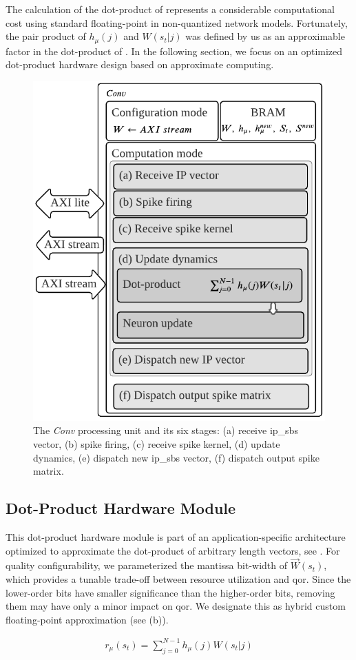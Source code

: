 The calculation of the dot-product of  represents a considerable computational cost using standard floating-point in non-quantized network models. Fortunately, the pair product of $h_{\mu}(j)$ and $W(s_t|j)$ was defined by us as an approximable factor in the dot-product of . In the following section, we focus on an optimized dot-product hardware design based on approximate computing.


\begin{figure}[b!]
	\centering
	\includegraphics[width=0.5\columnwidth]{./chapters/sbs_accelerator/figures/sbs_conv.pdf}
	\caption{The \emph{Conv} processing unit and its six stages: (a) receive \gls{ip_sbs} vector, (b) spike firing, (c) receive spike kernel, (d) update dynamics, (e) dispatch new \gls{ip_sbs} vector, (f) dispatch output spike matrix.}
	\label{fig:hw_conv}
\end{figure}

\subsection{Dot-Product Hardware Module}
\label{sec:dot-product_hardware_module}
This dot-product hardware module is part of an application-specific architecture optimized to approximate the dot-product of arbitrary length vectors, see . For quality configurability, we parameterized the mantissa bit-width of $\vec{W}(s_t)$, which provides a tunable trade-off between resource utilization and \gls{qor}. Since the lower-order bits have smaller significance than the higher-order bits, removing them may have only a minor impact on \gls{qor}. We designate this as hybrid custom floating-point approximation (see {}(b)).

\begin{eqnarray} \label{eq:dot_product}
r_{\mu}\left(s_t\right)=\sum_{j=0}^{N-1}h_{\mu}(j)W(s_t|j)
\end{eqnarray}

